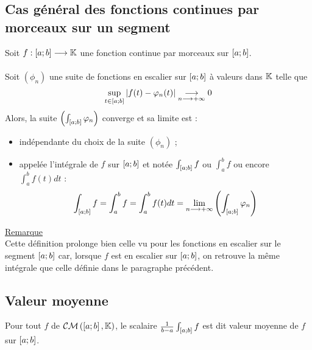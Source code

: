 \subsection{Cas général des fonctions continues par morceaux sur un segment}
\begin{defprop}
    Soit \(f : \left[a;b\right] \longrightarrow \mathbb{K}\) une fonction continue par morceaux sur \(\left[a;b\right]\).\\~\\
    Soit \((\phi_n)\) une suite de fonctions en escalier sur \(\left[a;b\right]\) à valeurs dans \(\mathbb{K}\) telle que 
    \[\sup_{t\in \left[a;b\right]} \left\lvert f (t) -  \varphi_n(t)\right\rvert \underset{n\longrightarrow+\infty}{\longrightarrow}  0\]
    Alors, la suite \(\left(\int_{\left[a;b\right]} \varphi_n\right)\) converge et sa limite est :
    \begin{itemize}
        \item indépendante du choix de la suite \((\phi_n)\) ;
        \item appelée l’intégrale de \(f\) sur \(\left[a;b\right]\) et notée \(\int_{\left[a;b\right]} f\) ou \(\int^b_a f\) ou encore \(\int^b_a f (t)dt\) :
        \[\int_{\left[a;b\right]} f = \int^b_a f = \int^b_a f (t)dt = \lim_{n\longrightarrow+\infty}\left(\int_{\left[a;b\right]} \varphi_n\right)\]
    \end{itemize}
    \underline{Remarque}\\
    Cette définition prolonge bien celle vu pour les fonctions en escalier sur le segment \(\left[a;b\right]\) car, lorsque \(f\) est en escalier sur \(\left[a;b\right]\), on retrouve la même intégrale que celle définie dans le paragraphe précédent.
\end{defprop}
\subsection{Valeur moyenne}
\begin{defprop}
    Pour tout \(f\) de \(\mathcal{CM} \left(\left[a;b\right], \mathbb{K}\right)\), le scalaire \(\frac{1}{b - a}\int_{\left[a;b\right]} f\) est dit valeur moyenne de \(f\) sur \(\left[a;b\right]\).
\end{defprop}
